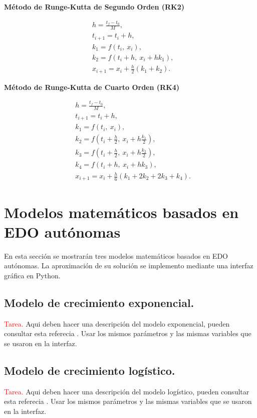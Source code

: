 \documentclass[12pt,letterpaper]{article}
\begin{document}
\parbox{8cm}{
    \begin{center}
        {\bf Método de Runge-Kutta de Segundo Orden (RK2)}
    \end{center}
 \begin{align*}
    & h=\frac{t_f-t_0}{M},\\
    & t_{i+1}=t_{i}+h, \\
    & k_1=f(t_i,\ x_i),\\
    & k_2=f(t_i+h,\ x_i+hk_1),\\
    & x_{i+1} = x_i + \frac{h}{2}(k_1+k_2).
\end{align*}
}\hfill
\parbox{8cm}{
    \begin{center}
        {\bf Método de Runge-Kutta de Cuarto Orden (RK4)}
    \end{center}
 \begin{align*}
    & h=\frac{t_f-t_0}{M},\\
    & t_{i+1}=t_{i}+h, \\
    & k_1=f(t_i,\ x_i),\\
    & k_2=f\left(t_i+\frac{h}{2},\ x_i+h\frac{k_1}{2}\right),\\
    & k_3=f\left(t_i+\frac{h}{2},\ x_i+h\frac{k_2}{2}\right),\\
    & k_4=f\left(t_i+h,\ x_i+hk_3\right),\\
    & x_{i+1} = x_i + \frac{h}{6}(k_1+2k_2+2k_3+k_4).
\end{align*}
}

\section{Modelos matemáticos basados en EDO autónomas}
En esta sección se mostrarán tres modelos matemáticos basados en EDO autónomas. La aproximación de su solución se implemento mediante una interfaz gráfica en Python.

\subsection{Modelo de crecimiento exponencial.}
\textcolor{red}{Tarea.} Aqui deben hacer una descripción del modelo exponencial, pueden consultar esta referecia \cite[Capitulo 3]{librozill}. Usar los mismos parámetros y las mismas variables que se usaron en la interfaz.

\subsection{Modelo de crecimiento logístico.}
\textcolor{red}{Tarea.} Aqui deben hacer una descripción del modelo logístico, pueden consultar esta referecia \cite[Capitulo 3]{librozill}. Usar los mismos parámetros y las mismas variables que se usaron en la interfaz.
\end{document}
